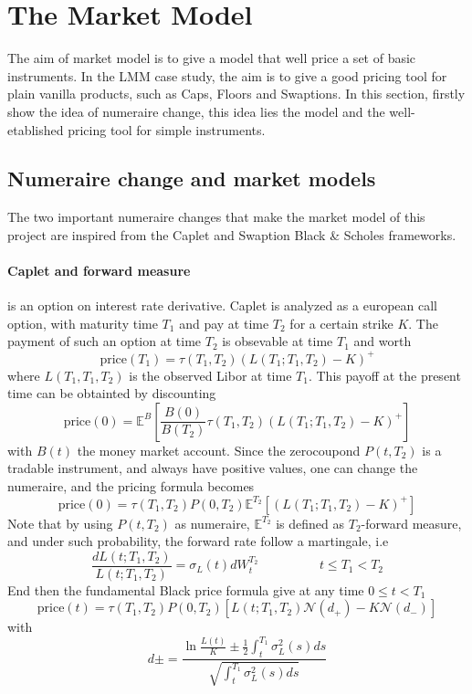 \documentclass[a4paper,10pt]{article}
\begin{document}
\newpage
\section{The Market Model}
The aim of market model is to give a model that well price a set of basic instruments. In the LMM case study, the aim is to give a good pricing tool for plain vanilla products, such as Caps, Floors and Swaptions. In this section, firstly show the idea of numeraire change, this idea lies the model and the well-etablished pricing tool for simple instruments. 
\subsection{Numeraire change and market models}
The two important numeraire changes that make the market model of this project are inspired from the Caplet and Swaption Black \& Scholes frameworks. 
\paragraph{ Caplet and forward measure } is an option on interest rate derivative. Caplet is analyzed as a european call option, with maturity time $T_1$ and pay at time $T_2$ for a certain strike $K$. The payment of such an option at time $T_2$ is obsevable at time $T_1$ and worth
\[
\text{price}(T_1) = \tau(T_1,T_2)( L(T_1;T_1,T_2) - K )^+ 
\] 
where $L(T_1,T_1,T_2)$ is the observed Libor at time $T_1$. This payoff at the present time can be obtainted by discounting 
\[
\text{price}(0) = \mathbb{E}^{B}\left[ \frac{B(0)}{B(T_2)} \tau(T_1,T_2)( L(T_1;T_1,T_2) - K )^+  \right]
\]
with $B(t)$ the money market account. Since the zerocoupond $P(t,T_2)$ is a tradable instrument, and always have positive values, one can change the numeraire, and the pricing formula becomes
\[
\text{price}(0) = \tau(T_1,T_2)P(0,T_2) \mathbb{E}^{T_2}\left[ ( L(T_1;T_1,T_2) - K )^+  \right]
\]
Note that by using $P(t,T_2)$ as numeraire, $\mathbb{E}^{T_2}$ is defined as $T_2$-forward measure, and under such probability, the forward rate follow a martingale, i.e
\[
\frac{dL(t;T_1,T_2)}{L(t;T_1,T_2)} = \sigma_{L}(t)dW^{T_2}_t
\hspace{2cm}
t\leq T_1 < T_2
\]
End then the fundamental Black price formula give at any time $0 \leq t < T_1$
\[
\text{price}(t) = \tau(T_1,T_2)P(0,T_2) \left[ L(t;T_1,T_2) \mathcal{N}(d_+) - K \mathcal{N}(d_-) \right]
\]
with
\[
d\pm = \frac{\ln{\frac{L(t)}{K}} \pm \frac{1}{2}\int_{t}^{T_1}\sigma^2_{L}(s)ds  }{ \sqrt{\int_{t}^{T_1}\sigma^2_{L}(s)ds} }
\]
\end{document}
